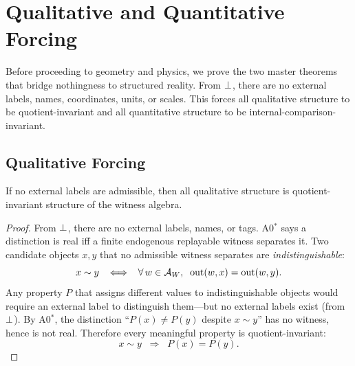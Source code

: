 
\section{Qualitative and Quantitative Forcing}
\label{sec:forcing}

Before proceeding to geometry and physics, we prove the two master theorems
that bridge nothingness to structured reality.  From $\bot$, there are no
external labels, names, coordinates, units, or scales.  This forces all
qualitative structure to be quotient-invariant and all quantitative
structure to be internal-comparison-invariant.

\subsection{Qualitative Forcing}
\label{sec:forcing:qualitative}

\begin{theorem}
\label{thm:qualitative-forcing}
If no external labels are admissible, then all qualitative structure is
quotient-invariant structure of the witness algebra.
\begin{proof}[Proof]
From $\bot$, there are no external labels, names, or tags.  A0$^*$ says a
distinction is real iff a finite endogenous replayable witness separates
it.  Two candidate objects $x, y$ that no admissible witness separates are
\emph{indistinguishable}:
\[
  x \sim y \;\;\iff\;\; \forall\, w \in \mathcal{A}_W,\;\;
  \mathrm{out}(w, x) = \mathrm{out}(w, y).
\]
Any property $P$ that assigns different values to indistinguishable objects
would require an external label to distinguish them---but no external
labels exist (from $\bot$).  By A0$^*$, the distinction ``$P(x) \neq P(y)$
despite $x \sim y$'' has no witness, hence is not real.  Therefore every
meaningful property is quotient-invariant:
\[
  x \sim y \;\;\Longrightarrow\;\; P(x) = P(y).
\]
\end{proof}
\end{theorem}

